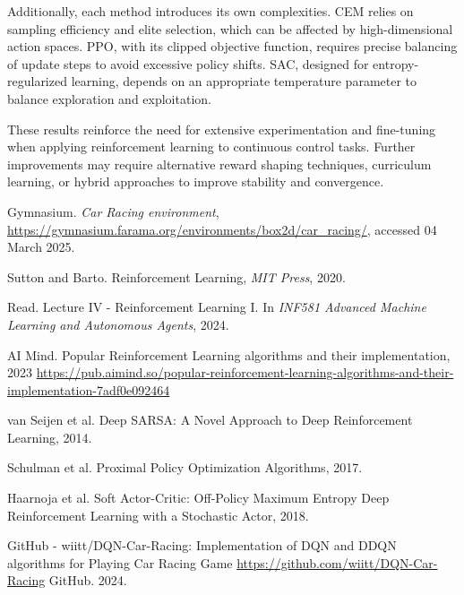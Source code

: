 \documentclass[../CSC_52081_EP.tex]{subfiles}
\begin{document}
        Additionally, each method introduces its own complexities. CEM relies on sampling efficiency and elite selection, which can be affected by high-dimensional action spaces. PPO, with its clipped objective function, requires precise balancing of update steps to avoid excessive policy shifts. SAC, designed for entropy-regularized learning, depends on an appropriate temperature parameter to balance exploration and exploitation.

        These results reinforce the need for extensive experimentation and fine-tuning when applying reinforcement learning to continuous control tasks. Further improvements may require alternative reward shaping techniques, curriculum learning, or hybrid approaches to improve stability and convergence.

    \begin{thebibliography}{4}
            Gymnasium. \textit{Car Racing environment}, \url{https://gymnasium.farama.org/environments/box2d/car_racing/}, accessed 04 March 2025.

        Sutton and Barto. Reinforcement Learning,
        {\em MIT Press}, 2020.

            Read. Lecture IV - Reinforcement Learning I. In \textit{INF581 Advanced Machine Learning and Autonomous Agents}, 2024.

            AI Mind. Popular Reinforcement Learning algorithms and their implementation, 2023 \url{https://pub.aimind.so/popular-reinforcement-learning-algorithms-and-their-implementation-7adf0e092464}

            van Seijen et al. Deep SARSA: A Novel Approach to Deep Reinforcement Learning, 2014.

            Schulman et al. Proximal Policy Optimization Algorithms, 2017.

            Haarnoja et al. Soft Actor-Critic: Off-Policy Maximum Entropy Deep Reinforcement Learning with a Stochastic Actor, 2018.

            GitHub - wiitt/DQN-Car-Racing: Implementation of DQN and DDQN algorithms for Playing Car Racing Game \url{https://github.com/wiitt/DQN-Car-Racing} GitHub. 2024.


        \end{thebibliography}
\end{document}

